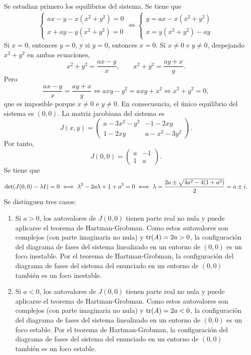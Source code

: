 \documentclass[11pt]{report}
\begin{document}
\begin{solution}
    Se estudian primero los equilibrios del sistema. Se tiene que
    \begin{align*}
        \begin{cases}
            ax-y-x(x^2+y^2) = 0 \\
            x+ay-y(x^2+y^2) = 0
        \end{cases} \iff \begin{cases}
            y = ax-x(x^2+y^2) \\
            x = y(x^2+y^2)-ay
        \end{cases}
    \end{align*}
    Si $x = 0$, entonces $y = 0$, y si $y = 0$, entonces $x = 0$. Si $x \neq 0$ e $y \neq 0$, despejando $x^2+y^2$ en ambas ecuaciones, 
    \[x^2+y^2 = \frac{ax-y}{x}, \qquad x^2+y^2 = \frac{ay+x}{y}.\]
    Pero
    \[\frac{ax-y}{x} = \frac{ay+x}{y} \iff axy-y^2 = axy+x^2 \iff x^2+y^2 = 0,\]
    que es imposible porque $x \neq0$ e $y \neq 0$. En consecuencia, el único equilibrio del sistema es $(0,0)$. La matriz jacobiana del sistema es
    \[J(x,y) = \left(\begin{array}{cc}
        a-3x^2-y^2 & -1-2xy \\
        1-2xy & a -x^2-3y^2
    \end{array}\right).\]
    Por tanto,
    \[J(0,0) = \left(\begin{array}{cc}
        a & -1 \\
        1 & a
    \end{array}\right).\]
    Se tiene que
    \[\textup{det}(J(0,0)-\lambda I) = 0 \iff  \lambda^2-2a\lambda+1+a^2= 0 \iff \lambda = \frac{2a\pm \sqrt{4a^2-4(1+a^2)}}{2} = a\pm i.\]
    Se distinguen tres casos:
    \begin{enumerate}
        \item Si $a>0$, los autovalores de $J(0,0)$ tienen parte real no nula y puede aplicarse el teorema de Hartman-Grobman. Como estos autovalores son complejos (con parte imaginaria no nula) y $\textup{tr}(A) = 2a > 0$, la configuración del diagrama de fases del sistema linealizado en un entorno de $(0,0)$ es un foco inestable. Por el teorema de Hartman-Grobman, la configuración del diagrama de fases del sistema del enunciado en un entorno de $(0,0)$ también es un foco inestable.
        \item Si $a<0$, los autovalores de $J(0,0)$ tienen parte real no nula y puede aplicarse el teorema de Hartman-Grobman. Como estos autovalores son complejos (con parte imaginaria no nula) y $\textup{tr}(A) = 2a < 0$, la configuración del diagrama de fases del sistema linealizado en un entorno de $(0,0)$ es un foco estable. Por el teorema de Hartman-Grobman, la configuración del diagrama de fases del sistema del enunciado en un entorno de $(0,0)$ también es un foco estable.

\end{enumerate}
\end{solution}
\end{document}
